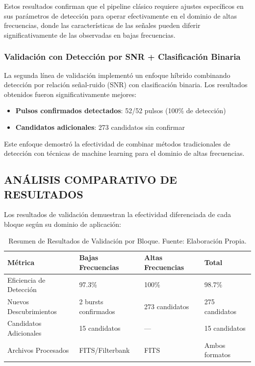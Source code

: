 Estos resultados confirman que el pipeline clásico requiere ajustes específicos en sus parámetros de detección para operar efectivamente en el dominio de altas frecuencias, donde las características de las señales pueden diferir significativamente de las observadas en bajas frecuencias.

\subsubsection{Validación con Detección por SNR + Clasificación Binaria}

La segunda línea de validación implementó un enfoque híbrido combinando detección por relación señal-ruido (SNR) con clasificación binaria. Los resultados obtenidos fueron significativamente mejores:

\begin{itemize}
    \item \textbf{Pulsos confirmados detectados}: 52/52 pulsos (100\% de detección)
    \item \textbf{Candidatos adicionales}: 273 candidatos sin confirmar
\end{itemize}

Este enfoque demostró la efectividad de combinar métodos tradicionales de detección con técnicas de machine learning para el dominio de altas frecuencias.

\subsection{ANÁLISIS COMPARATIVO DE RESULTADOS}

Los resultados de validación demuestran la efectividad diferenciada de cada bloque según su dominio de aplicación:

\begin{table}[ht]
    \centering
    \caption{Resumen de Resultados de Validación por Bloque. Fuente: Elaboración Propia.}
    \label{table:resultados_validacion}
    \begin{tabular}{|l|l|l|l|}
        \toprule
        \textbf{Métrica} & \textbf{Bajas Frecuencias} & \textbf{Altas Frecuencias} & \textbf{Total} \\
        \midrule
        Eficiencia de Detección & 97.3\% & 100\% & 98.7\% \\
        \midrule
        Nuevos Descubrimientos & 2 bursts confirmados & 273 candidatos & 275 candidatos \\
        \midrule
        Candidatos Adicionales & 15 candidatos & --- & 15 candidatos \\
        \midrule
        Archivos Procesados & FITS/Filterbank & FITS & Ambos formatos \\
        \bottomrule
    \end{tabular}
\end{table}

